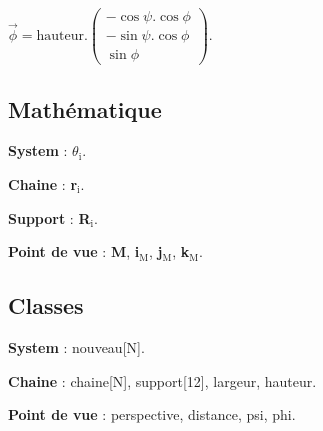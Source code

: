 	$\overrightarrow{\phi} = \text{hauteur} .
	\begin{pmatrix}
		- \cos \psi . \cos \phi \\
		- \sin \psi . \cos \phi \\
		\sin \phi
	\end{pmatrix}$.
%
\subsection{Mathématique}
\begin{description}[leftmargin=0.1cm, itemsep=5pt]
\item{\bf System} : $\theta _\text{i}$.
\item{\bf Chaine} : {\bf r}$_\text{i}$.
\item{\bf Support} : {\bf R}$_\text{i}$.
\item{\bf Point de vue} : {\bf M}, {\bf i}$_\text{M}$,
                                   {\bf j}$_\text{M}$,
                                   {\bf k}$_\text{M}$.
\end{description}
\subsection{Classes}
\begin{description}[leftmargin=0.1cm, itemsep=5pt]
\item{\bf System} : nouveau[N].
\item{\bf Chaine} : chaine[N], support[12], largeur, hauteur.
\item{\bf Point de vue} : perspective, distance, psi, phi.
\end{description}
